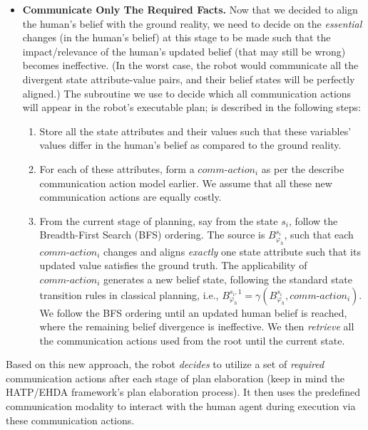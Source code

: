 \documentclass[letterpaper]{article} %
\begin{document}
\begin{itemize}
    \item \textbf{Communicate Only The Required Facts.}
    Now that we decided to align the human's belief with the ground reality, we need to decide on the \textit{essential} changes (in the human's belief) at this stage to be made such that the impact/relevance of the human's updated belief (that may still be wrong) becomes ineffective. (In the worst case, the robot would communicate all the divergent state attribute-value pairs, and their belief states will be perfectly aligned.) 
    The subroutine we use to decide which all communication actions will appear in the robot's executable plan; is described in the following steps:
    \begin{enumerate}
        \item Store all the state attributes and their values such that these variables' values differ in the human's belief as compared to the ground reality. 
        \item For each of these attributes, form a $\textit{comm-action}_i$ as per the describe communication action model earlier. We assume that all these new communication actions are equally costly. 
        \item From the current stage of planning, say from the state $s_i$, follow the Breadth-First Search (BFS) ordering. 
        The source is $B_{\varphi_h}^{s_i}$, such that each $\textit{comm-action}_i$ changes and aligns \textit{exactly} one state attribute such that its updated value satisfies the ground truth. 
        The applicability of $\textit{comm-action}_i$  generates a new belief state, following the standard state transition rules in classical planning, i.e., 
        $B_{\varphi_h}^{s_i,1} = \gamma(B_{\varphi_h}^{s_i}, \textit{comm-action}_i)$. 
        We follow the BFS ordering until an updated human belief is reached, where the remaining belief divergence is ineffective. 
        We then \textit{retrieve} all the communication actions used from the root until the current state.   
    \end{enumerate}
    
\end{itemize}

Based on this new approach, the robot \textit{decides} to utilize a set of \textit{required} communication actions after each stage of plan elaboration (keep in mind the HATP/EHDA framework's plan elaboration process). 
It then uses the predefined communication modality to interact with the human agent during execution via these communication actions. 
\end{document}
